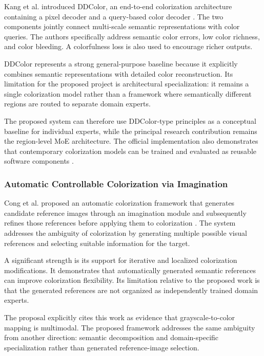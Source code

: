 \documentclass{FastFyp}
\begin{document}
Kang et al. introduced DDColor, an end-to-end colorization architecture containing a pixel decoder and a query-based color decoder \cite{ref9}. The two components jointly connect multi-scale semantic representations with color queries. The authors specifically address semantic color errors, low color richness, and color bleeding. A colorfulness loss is also used to encourage richer outputs.

DDColor represents a strong general-purpose baseline because it explicitly combines semantic representations with detailed color reconstruction. Its limitation for the proposed project is architectural specialization: it remains a single colorization model rather than a framework where semantically different regions are routed to separate domain experts.

The proposed system can therefore use DDColor-type principles as a conceptual baseline for individual experts, while the principal research contribution remains the region-level MoE architecture. The official implementation also demonstrates that contemporary colorization models can be trained and evaluated as reusable software components \cite{ref10}.

\subsubsection{Automatic Controllable Colorization via Imagination}

Cong et al. proposed an automatic colorization framework that generates candidate reference images through an imagination module and subsequently refines those references before applying them to colorization \cite{ref11}. The system addresses the ambiguity of colorization by generating multiple possible visual references and selecting suitable information for the target.

A significant strength is its support for iterative and localized colorization modifications. It demonstrates that automatically generated semantic references can improve colorization flexibility. Its limitation relative to the proposed work is that the generated references are not organized as independently trained domain experts.

The proposal explicitly cites this work as evidence that grayscale-to-color mapping is multimodal. The proposed framework addresses the same ambiguity from another direction: semantic decomposition and domain-specific specialization rather than generated reference-image selection.
\end{document}
